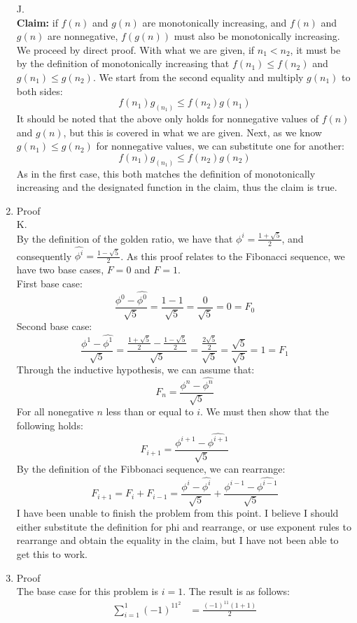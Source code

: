 \documentclass{article}
\begin{document}
\begin{enumerate}
	J. \\
	\textbf{Claim:} if $f(n)$ and $g(n)$ are monotonically increasing, and $f(n)$ and $g(n)$ are nonnegative, $f(g(n))$ must also be monotonically increasing.
		\\ We proceed by direct proof. With what we are given, if $n_1<n_2$, it must be by the definition of monotonically increasing that $f(n_1)\leq f(n_2)$ and $g(n_1)\leq g(n_2)$. We start from the second equality and multiply $g(n_1)$ to both sides:
	$$f(n_1)g_(n_1)\leq f(n_2)g(n_1)$$
	It should be noted that the above only holds for nonnegative values of $f(n)$ and $g(n)$, but this is covered in what we are given. Next, as we know $g(n_1)\leq g(n_2)$ for nonnegative values, we can substitute one for another:
	$$f(n_1)g_(n_1)\leq f(n_2)g(n_2)$$
	As in the first case, this both matches the definition of monotonically increasing and the designated function in the claim, thus the claim is true.
	\item Proof \\
	K. \\
	By the definition of the golden ratio, we have that $\phi^i=\frac{1+\sqrt{5}}{2}$, and consequently $\hat{\phi^i}=\frac{1-\sqrt{5}}{2}$. As this proof relates to the Fibonacci sequence, we have two base cases, $F=0$ and $F=1$.\\
	First base case: 
	$$\frac{\phi^0-\hat{\phi^0}}{\sqrt{5}}=\frac{1-1}{\sqrt{5}}=\frac{0}{\sqrt{5}}=0=F_0$$
	Second base case:
	$$\frac{\phi^1-\hat{\phi^1}}{\sqrt{5}}=\frac{\frac{1+\sqrt{5}}{2}-\frac{1-\sqrt{5}}{2}}{\sqrt{5}}=\frac{\frac{2\sqrt{5}}{2}}{\sqrt{5}}=\frac{\sqrt{5}}{\sqrt{5}}=1=F_1$$
	Through the inductive hypothesis, we can assume that:
	$$F_n=\frac{\phi^n-\hat{\phi^n}}{\sqrt{5}}$$
	For all nonegative $n$ less than or equal to $i$. We must then show that the following holds:	
	$$F_{i+1}=\frac{\phi^{i+1}-\hat{\phi^{i+1}}}{\sqrt{5}}$$
	By the definition of the Fibbonaci sequence, we can rearrange:
	$$F_{i+1}=F_i+F_{i-1}=\frac{\phi^i-\hat{\phi^i}}{\sqrt{5}}+\frac{\phi^{i-1}-\hat{\phi^{i-1}}}{\sqrt{5}}$$
	I have been unable to finish the problem from this point. I believe I should either substitute the definition for phi and rearrange, or use exponent rules to rearrange and obtain the equality in the claim, but I have not been able to get this to work.
	\item Proof \\
	The base case for this problem is $i=1$. The result is as follows:
	\begin{align}
	\sum_{i=1}^{1}(-1)^11^2&=\frac{(-1)^11(1+1)}{2} \\

\end{align}
\end{enumerate}
\end{document}
